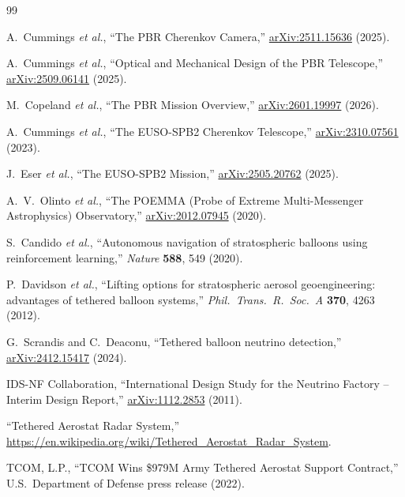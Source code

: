 \documentclass[11pt]{article}
\begin{document}
\begin{thebibliography}{99}

  A.~Cummings \textit{et al.},
  ``The PBR Cherenkov Camera,''
  \href{https://arxiv.org/abs/2511.15636}{arXiv:2511.15636} (2025).

  A.~Cummings \textit{et al.},
  ``Optical and Mechanical Design of the PBR Telescope,''
  \href{https://arxiv.org/abs/2509.06141}{arXiv:2509.06141} (2025).

  M.~Copeland \textit{et al.},
  ``The PBR Mission Overview,''
  \href{https://arxiv.org/abs/2601.19997}{arXiv:2601.19997} (2026).

  A.~Cummings \textit{et al.},
  ``The EUSO-SPB2 Cherenkov Telescope,''
  \href{https://arxiv.org/abs/2310.07561}{arXiv:2310.07561} (2023).

  J.~Eser \textit{et al.},
  ``The EUSO-SPB2 Mission,''
  \href{https://arxiv.org/abs/2505.20762}{arXiv:2505.20762} (2025).

  A.~V.~Olinto \textit{et al.},
  ``The POEMMA (Probe of Extreme Multi-Messenger Astrophysics) Observatory,''
  \href{https://arxiv.org/abs/2012.07945}{arXiv:2012.07945} (2020).

  S.~Candido \textit{et al.},
  ``Autonomous navigation of stratospheric balloons using reinforcement learning,''
  \textit{Nature} \textbf{588}, 549 (2020).

  P.~Davidson \textit{et al.},
  ``Lifting options for stratospheric aerosol geoengineering: advantages of tethered balloon systems,''
  \textit{Phil.\ Trans.\ R.\ Soc.\ A} \textbf{370}, 4263 (2012).

  G.~Scrandis and C.~Deaconu,
  ``Tethered balloon neutrino detection,''
  \href{https://arxiv.org/abs/2412.15417}{arXiv:2412.15417} (2024).

  IDS-NF Collaboration,
  ``International Design Study for the Neutrino Factory -- Interim Design Report,''
  \href{https://arxiv.org/abs/1112.2853}{arXiv:1112.2853} (2011).

  ``Tethered Aerostat Radar System,''
  \url{https://en.wikipedia.org/wiki/Tethered_Aerostat_Radar_System}.

  TCOM, L.P.,
  ``TCOM Wins \$979M Army Tethered Aerostat Support Contract,''
  U.S.\ Department of Defense press release (2022).


\end{thebibliography}
\end{document}
